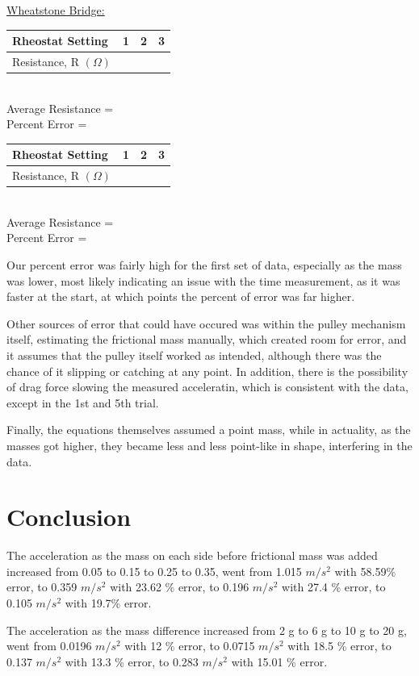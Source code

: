 \documentclass[11pt, titlepage]{article}
\begin{document}
\underline{Wheatstone Bridge:}
\begin{center}
\begin{tabular}
{|m{9em}|m{7em}|m{7em}|m{7em}|}
\hline
Rheostat Setting & 1 & 2 & 3 \\
\hline
Resistance, R $(\Omega)$ & & & \\
\hline
\end{tabular}
\\Average Resistance = 
\\Percent Error = 
\end{center}

\begin{center}
\begin{tabular}
{|m{9em}|m{7em}|m{7em}|m{7em}|}
\hline
Rheostat Setting & 1 & 2 & 3 \\
\hline
Resistance, R $(\Omega)$ & & & \\
\hline
\end{tabular}
\\Average Resistance = 
\\Percent Error = 
\end{center}


Our percent error was fairly high for the first set of data, especially as the mass was lower, most likely indicating an issue with the time measurement, as it was faster at the start, at which points the percent of error was far higher. 

Other sources of error that could have occured was within the pulley mechanism itself, estimating the frictional mass manually, which created room for error, and it assumes that the pulley itself worked as intended, although there was the chance of it slipping or catching at any point. In addition, there is the possibility of drag force slowing the measured acceleratin, which is consistent with the data, except in the 1st and 5th trial.

Finally, the equations themselves assumed a point mass, while in actuality, as the masses got higher, they became less and less point-like in shape, interfering in the data.

\section*{Conclusion}

The acceleration as the mass on each side before frictional mass was added increased from 0.05 to 0.15 to 0.25 to 0.35, went from 1.015 $m/s^2$ with 58.59\% error, to 0.359 $m/s^2$ with 23.62 \% error, to 0.196 $m/s^2$ with 27.4 \% error, to 0.105 $m/s^2$ with 19.7\% error.

The acceleration as the mass difference increased from 2 g to 6 g to 10 g to 20 g, went from 0.0196 $m/s^2$ with 12 \% error, to 0.0715 $m/s^2$ with 18.5 \% error, to 0.137 $m/s^2$ with 13.3 \% error, to 0.283 $m/s^2$ with 15.01 \% error. 
\end{document}
